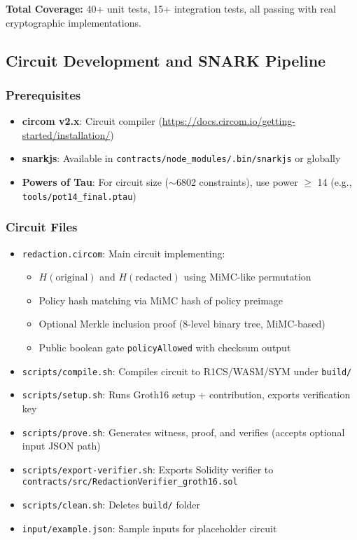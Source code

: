 \textbf{Total Coverage:} 40+ unit tests, 15+ integration tests, all passing with real cryptographic implementations.

\subsection{Circuit Development and SNARK Pipeline}

\subsubsection{Prerequisites}

\begin{itemize}
    \item \textbf{circom v2.x}: Circuit compiler (\url{https://docs.circom.io/getting-started/installation/})
    \item \textbf{snarkjs}: Available in \texttt{contracts/node\_modules/.bin/snarkjs} or globally
    \item \textbf{Powers of Tau}: For circuit size ($\sim$6802 constraints), use power $\geq$ 14 (e.g., \texttt{tools/pot14\_final.ptau})
\end{itemize}

\subsubsection{Circuit Files}

\begin{itemize}
    \item \texttt{redaction.circom}: Main circuit implementing:
    \begin{itemize}
        \item $H(\text{original})$ and $H(\text{redacted})$ using MiMC-like permutation
        \item Policy hash matching via MiMC hash of policy preimage
        \item Optional Merkle inclusion proof (8-level binary tree, MiMC-based)
        \item Public boolean gate \texttt{policyAllowed} with checksum output
    \end{itemize}
    \item \texttt{scripts/compile.sh}: Compiles circuit to R1CS/WASM/SYM under \texttt{build/}
    \item \texttt{scripts/setup.sh}: Runs Groth16 setup + contribution, exports verification key
    \item \texttt{scripts/prove.sh}: Generates witness, proof, and verifies (accepts optional input JSON path)
    \item \texttt{scripts/export-verifier.sh}: Exports Solidity verifier to \texttt{contracts/src/RedactionVerifier\_groth16.sol}
    \item \texttt{scripts/clean.sh}: Deletes \texttt{build/} folder
    \item \texttt{input/example.json}: Sample inputs for placeholder circuit
\end{itemize}


